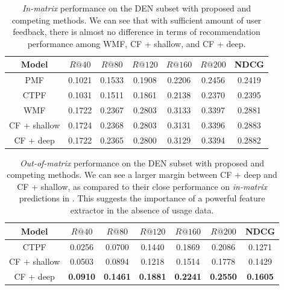 \begin{table}
\centering
  \begin{tabular}{ c  c  c  c  c c   c  }
    \toprule
    Model & $R@40$  & $R@80$  & $R@120$  & $R@160$ & $R@200$ & NDCG \\ \midrule
     \gls{PMF} \citep{Gopalan:2015} & 0.1021 & 0.1533 &  0.1908 & 0.2206 & 0.2456 & 0.2419 \\
     \gls{CTPF} \citep{gopalan2014content} &  0.1031 & 0.1511  & 0.1861  & 0.2138  & 0.2370 & 0.2395 \\
     \gls{WMF} \citep{hu2008collaborative} & 0.1722  &  0.2367 & 0.2803 & 0.3133 & 0.3397 & 0.2881 \\
     CF + shallow & 0.1724 & 0.2368 & 0.2803 & 0.3131 & 0.3396 & 0.2883\\
     CF + deep & {0.1722} & {0.2365} & {0.2800} & {0.3129} & {0.3394} & {0.2882} \\
    \bottomrule
  \end{tabular}
  \caption{\emph{In-matrix} performance on the DEN subset with proposed and competing methods. We can see that with sufficient amount of user feedback, there is almost no difference in terms of recommendation performance among WMF, CF + shallow, and CF + deep.} 
  \label{tab:in-matrix}
\end{table}

\begin{table}
\centering
  \begin{tabular}{ c  c  c  c  c c   c  }
    \toprule
    Model & $R@40$  & $R@80$  & $R@120$  & $R@160$ & $R@200$ & NDCG \\ \midrule
     \gls{CTPF} \citep{gopalan2014content} &  0.0256 &  0.0700  &  0.1440  & 0.1869  &  0.2086 & 0.1271 \\
     CF + shallow & 0.0503 & 0.0894 & 0.1218 & 0.1514 & 0.1778 & 0.1429\\
     CF + deep & \bf{0.0910} & \bf{0.1461} & \bf{0.1881} & \bf{0.2241} & \bf{0.2550} & \bf{0.1605} \\
    \bottomrule
  \end{tabular}
  \caption{\emph{Out-of-matrix} performance on the DEN subset with proposed and competing methods. We can see a larger margin between CF + deep and CF + shallow, as compared to their close performance on \emph{in-matrix} predictions in . This suggests the importance of a powerful feature extractor in the absence of usage data. } 
  \label{tab:out-matrix}
\end{table}

